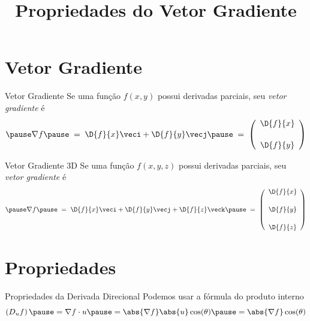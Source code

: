 
\usepackage{calculo_varias_variaveis-1}

\title{Propriedades do Vetor Gradiente}



\addtitle

\section{Vetor Gradiente}

\begin{frame}{Vetor Gradiente}
  Se uma função \(f(x, y)\) possui derivadas parciais,
  \pause
  seu \emph{vetor gradiente} é
  \[
    \pause
    \nabla f
    \pause
    \;=\; \D{f}{x}\veci + \D{f}{y}\vecj
    \pause
    \;=\; \left(\begin{array}{c} \D{f}{x} \\[5mm] \D{f}{y} \end{array}\right)
  \]
\end{frame}

\begin{frame}{Vetor Gradiente 3D}
  Se uma função \(f(x, y, z)\) possui derivadas parciais,
  \pause
  seu \emph{vetor gradiente} é
  \[
    \pause
    \nabla f
    \pause
    \;=\; \D{f}{x}\veci + \D{f}{y}\vecj + \D{f}{z}\veck
    \pause
    \;=\; \left(\begin{array}{c} \D{f}{x} \\[5mm] \D{f}{y} \\[5mm] \D{f}{z} \end{array}\right)
  \]
\end{frame}

\section{Propriedades}

\begin{frame}{Propriedades da Derivada Direcional}
  Podemos usar a fórmula do produto interno
  \[
    \left(D_u f\right)
    \pause
    = \nabla f \cdot u
    \pause
    = \abs{\nabla f} \abs{u} \cos(\theta)
    \pause
    = \abs{\nabla f} \cos(\theta)
  \]
\end{frame}

